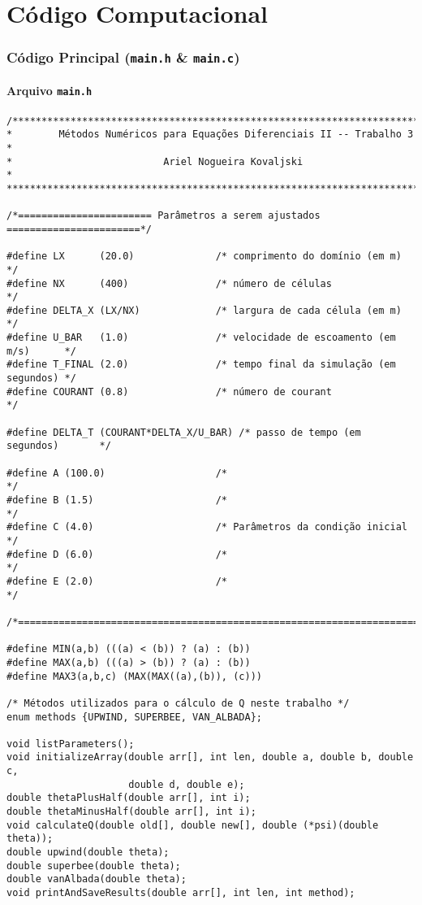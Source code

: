 \chapter{Código Computacional}

\subsection{Código Principal (\texttt{main.h} \& \texttt{main.c})}

\subsubsection{Arquivo \texttt{main.h}}

\begin{Verbatim}[fontsize=\footnotesize]
/******************************************************************************
*        Métodos Numéricos para Equações Diferenciais II -- Trabalho 3       *
*                          Ariel Nogueira Kovaljski                          *
******************************************************************************/

/*======================= Parâmetros a serem ajustados =======================*/

#define LX      (20.0)              /* comprimento do domínio (em m)          */
#define NX      (400)               /* número de células                      */
#define DELTA_X (LX/NX)             /* largura de cada célula (em m)          */
#define U_BAR   (1.0)               /* velocidade de escoamento (em m/s)      */
#define T_FINAL (2.0)               /* tempo final da simulação (em segundos) */
#define COURANT (0.8)               /* número de courant                      */

#define DELTA_T (COURANT*DELTA_X/U_BAR) /* passo de tempo (em segundos)       */

#define A (100.0)                   /*                                */
#define B (1.5)                     /*                                */
#define C (4.0)                     /* Parâmetros da condição inicial */
#define D (6.0)                     /*                                */
#define E (2.0)                     /*                                */

/*============================================================================*/

#define MIN(a,b) (((a) < (b)) ? (a) : (b))
#define MAX(a,b) (((a) > (b)) ? (a) : (b))
#define MAX3(a,b,c) (MAX(MAX((a),(b)), (c)))

/* Métodos utilizados para o cálculo de Q neste trabalho */
enum methods {UPWIND, SUPERBEE, VAN_ALBADA};

void listParameters();
void initializeArray(double arr[], int len, double a, double b, double c,
                     double d, double e);
double thetaPlusHalf(double arr[], int i);
double thetaMinusHalf(double arr[], int i);
void calculateQ(double old[], double new[], double (*psi)(double theta));
double upwind(double theta);
double superbee(double theta);
double vanAlbada(double theta);
void printAndSaveResults(double arr[], int len, int method);
\end{Verbatim}

